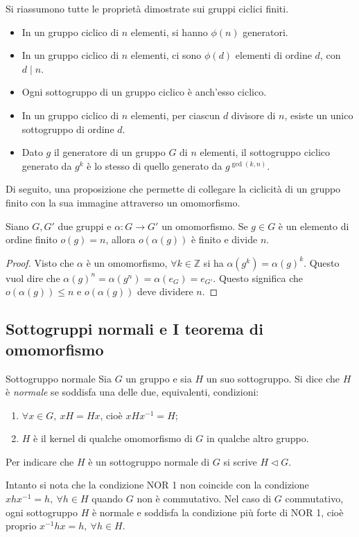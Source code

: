 \documentclass[11pt, a4paper]{scrartcl}
\theoremstyle{definition}
\numberwithin{esempio}{section}
\theoremstyle{definition}
\numberwithin{obs}{section}
\numberwithin{nota}{section}
\numberwithin{equation}{subsection}
\begin{document}
\noindent Si riassumono tutte le propriet\`a dimostrate sui gruppi ciclici finiti.
\begin{itemize}
\item In un gruppo ciclico di $n$ elementi, si hanno $\phi (n)$ generatori.
\item In un gruppo ciclico di $n$ elementi, ci sono $\phi (d)$ elementi di ordine $d$, con $d  \mid n$.
\item Ogni sottogruppo di un gruppo ciclico \`e anch'esso ciclico.
\item In un gruppo ciclico di $n$ elementi, per ciascun $d $ divisore di $n$, esiste un unico sottogruppo di ordine $d$.
\item Dato $g$ il generatore di un gruppo $G$ di $n$ elementi, il sottogruppo ciclico generato da $g^k$ \`e lo stesso di quello generato da $g^{\operatorname{gcd}(k,n) } $.
\end{itemize}
Di seguito, una proposizione che permette di collegare la ciclicit\`a di un gruppo finito con la sua immagine attraverso un omomorfismo.
\begin{prop}
	{}{}
	Siano $G,G'$ due gruppi e $\alpha  :G \to G'$ un omomorfismo. 
	Se $g \in G$ \`e un elemento di ordine finito $o(g) = n$, allora $o(\alpha (g))$ \`e finito e divide $n$.
	\begin{proof}
		Visto che $\alpha $ \`e un omomorfismo, $\forall  k \in \mathbb{Z}$ si ha $\alpha (g^k) = \alpha (g)^k$.
		Questo vuol dire che $\alpha (g) ^n = \alpha (g^n) = \alpha (e_G) = e_{G'} $.
		Questo significa che $o(\alpha (g)) \le n$ e $o(\alpha (g))$ deve dividere $n$.
	\end{proof}
\end{prop}









\subsection{Sottogruppi normali e I teorema di omomorfismo}
\begin{definizione}
	{Sottogruppo normale}{}
	Sia $G$ un gruppo e sia $H$ un suo sottogruppo. Si dice che $H $ \`e \textit{normale} se soddisfa una delle due, equivalenti, condizioni:
	\begin{enumerate}[NOR 1.]
		\item $\forall x \in G, \ xH = Hx$, cio\`e $xHx^{-1} = H$;
		\item $H$ \`e il kernel di qualche omomorfismo di $G$ in qualche altro gruppo.
	\end{enumerate}
	Per indicare che $H$ \`e un sottogruppo normale di $G$ si scrive $H \lhd G$.
\end{definizione}
\noindent Intanto si nota che la condizione NOR 1 non coincide con la condizione $x h x^{-1} = h, \ \forall h \in H$ quando $G$ non \`e commutativo.
Nel caso di $G$ commutativo, ogni sottogruppo $H$ \`e normale e soddisfa la condizione pi\`u forte di NOR 1, cio\`e proprio $x^{-1} h x = h, \ \forall h \in H$.
\end{document}
